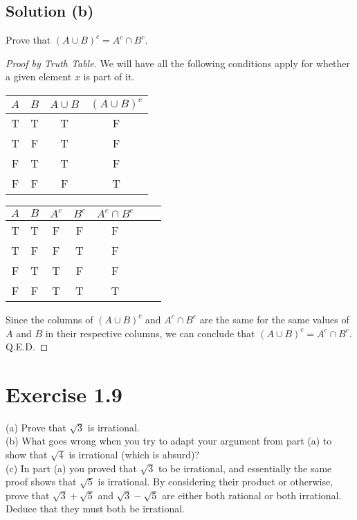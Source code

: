 \documentclass[12pt]{report}
\begin{document}
\subsection{Solution (b)}
Prove that $(A \cup B)^c = A^c \cap B^c$. 
\begin{proof}[Proof by Truth Table]
    We will have all the following conditions apply for whether a given element $x$ is part of it.
    \begin{center}
        \begin{tabular}{| c | c | c | c |}
            \hline
            $A$ &$B$    &$A \cup B$ &$(A \cup B)^c$\\
            \hline
            T   &T  &T  &F\\
            T   &F  &T  &F\\
            F   &T  &T  &F\\
            F   &F  &F  &T\\
            \hline
        \end{tabular}
        \begin{tabular}{| c | c | c | c | c | c | c |}
            \hline
            $A$ &$B$    &$A^c$  &$B^c$  &$A^c \cap B^c$\\
            \hline
            T   &T  &F  &F  &F\\
            T   &F  &F  &T  &F\\
            F   &T  &T  &F  &F\\
            F   &F  &T  &T  &T\\
            \hline
        \end{tabular}
    \end{center}

    Since the columns of $(A \cup B)^c$ and $A^c \cap B^c$ are the same for the same values of $A$ and $B$ in their respective columns, we can conclude that $(A \cup B)^c = A^c \cap B^c$.\\
    Q.E.D.
\end{proof}

\section{Exercise 1.9}
(a) Prove that $\sqrt{3}$ is irrational. \\
(b) What goes wrong when you try to adapt your argument from  part (a) to show that $\sqrt{4}$ is irrational (which is absurd)? \\
(c) In part (a) you proved that $\sqrt{3}$ to be irrational, and essentially the same proof shows that $\sqrt{5}$ is irrational. By considering their product or otherwise, prove that $\sqrt{3} + \sqrt{5}$ and $\sqrt{3} - \sqrt{5}$ are either both rational or both irrational. Deduce that they must both be irrational. 
\end{document}
